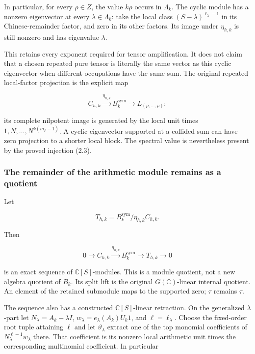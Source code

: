 In particular, for every \(\rho\in Z\), the value \(k\rho\) occurs in
\(\Lambda_k\). The cyclic module has a nonzero eigenvector at every
\(\lambda\in\Lambda_k\): take the local class
\((S-\lambda)^{\ell_\lambda-1}\) in its Chinese-remainder factor, and
zero in its other factors. Its image under \(\eta_{h,k}\) is still
nonzero and has eigenvalue \(\lambda\).

This retains every exponent required for tensor amplification. It does
not claim that a chosen repeated pure tensor is literally the same
vector as this cyclic eigenvector when different occupations have the
same sum. The original repeated-local-factor projection is the explicit
map

\[C_{h,k}\xrightarrow{\eta_{h,k}}B_k^{\mathrm{sym}}
\longrightarrow L_{(\rho,\ldots,\rho)};\tag{2.4}\]

its complete nilpotent image is generated by the local unit times
\(1,N,\ldots,N^{k(m_\rho-1)}\). A cyclic eigenvector supported at a
collided sum can have zero projection to a shorter local block. The
spectral value is nevertheless present by the proved injection (2.3).

\subsubsection{The remainder of the arithmetic module remains as a
quotient}\label{cyclic_sum:the-remainder-of-the-arithmetic-module-remains-as-a-quotient}

Let

\[T_{h,k}=B_k^{\mathrm{sym}}/\eta_{h,k}C_{h,k}.\]

Then

\[\boxed{0\to C_{h,k}\xrightarrow{\eta_{h,k}}B_k^{\mathrm{sym}}\to T_{h,k}\to0}\tag{2.5}\]

is an exact sequence of \(\mathbb C[S]\)-modules. This is a module
quotient, not a new algebra quotient of \(B_k\). Its split lift is the
original \(G(\mathbb C)\)-linear internal quotient. An element of the
retained submodule maps to the supported zero; \(\tau\) remains
\(\tau\).

The sequence also has a constructed \(\mathbb C[S]\)-linear retraction.
On the generalized \(\lambda\)-part let \(N_\lambda=A_k-\lambda I\),
\(w_\lambda=e_\lambda(A_k)U_k1\), and \(\ell=\ell_\lambda\). Choose the
fixed-order root tuple attaining \(\ell\) and let \(\vartheta_\lambda\)
extract one of the top monomial coefficients of
\(N_\lambda^{\ell-1}w_\lambda\) there. That coefficient is its nonzero
local arithmetic unit times the corresponding multinomial coefficient.
In particular

